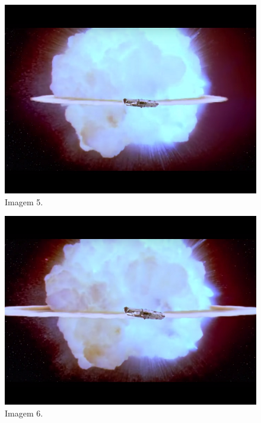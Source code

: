 \documentclass[14pt, oneside]{book}
\theoremstyle{definition}
\begin{document}
\begin{multicols}{2}
                     \begin{figure}[H]
                        \centering
                        \includegraphics[scale=0.65]{img5.png}
                        \caption{Imagem 5.}
                        \label{manual}
                     \end{figure}
                
                    \begin{figure}[H]
                        \centering
                        \includegraphics[scale=0.65]{img6.png}
                        \caption{Imagem 6.}
                        \label{manual}
                    \end{figure}
                

\end{multicols}
\end{document}
